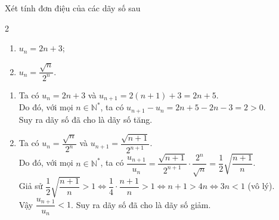 \begin{bt}%
	Xét tính đơn điệu của các dãy số sau
	\begin{multicols}{2}
		\begin{enumerate}
			\item $u_n=2n+3$;
			\item $u_n=\dfrac{\sqrt{n}}{2^n}$.
		\end{enumerate}
	\end{multicols}
	\loigiai 
	{
	\begin{enumerate}
		\item Ta có $u_n=2n+3$ và $u_{n+1}=2(n+1)+3=2n+5$.\\
		Do đó, với mọi $n\in \mathbb{N}^*$, ta có $u_{n+1}-u_n=2n+5-2n-3=2>0$.\\
		Suy ra dãy số đã cho là dãy số tăng.
		\item Ta có $u_n=\dfrac{\sqrt{n}}{2^n}$ và $u_{n+1}=\dfrac{\sqrt{n+1}}{2^{n+1}}$.\\
		Do đó, với mọi $n\in \mathbb{N}^*$, ta có $\dfrac{u_{n+1}}{u_n}=\dfrac{\sqrt{n+1}}{2^{n+1}}\cdot \dfrac{2^n}{\sqrt{n}}=\dfrac{1}{2}\sqrt{\dfrac{n+1}{n}}$.\\
		Giả sử $\dfrac{1}{2}\sqrt{\dfrac{n+1}{n}}>1\Leftrightarrow\dfrac{1}{4}\cdot\dfrac{n+1}{n}>1\Leftrightarrow n+1>4n\Leftrightarrow 3n<1$ (vô lý).\\
		Vậy $\dfrac{u_{n+1}}{u_n}<1$. Suy ra dãy số đã cho là dãy số giảm.
	\end{enumerate}
	}
\end{bt}


